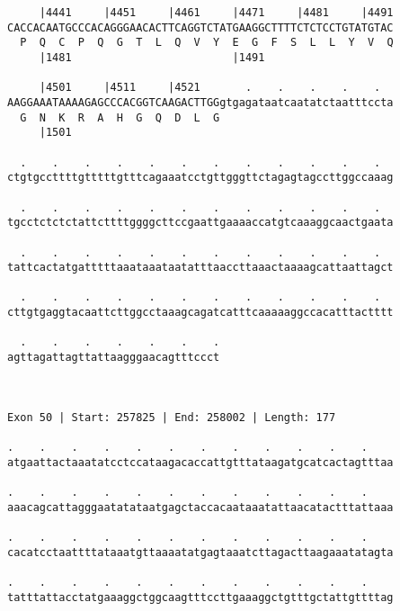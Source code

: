 \documentclass{article}
\begin{document}
\begin{Verbatim}
     |4441     |4451     |4461     |4471     |4481     |4491
CACCACAATGCCCACAGGGAACACTTCAGGTCTATGAAGGCTTTTCTCTCCTGTATGTAC
  P  Q  C  P  Q  G  T  L  Q  V  Y  E  G  F  S  L  L  Y  V  Q
     |1481                         |1491                    
  
     |4501     |4511     |4521       .    .    .    .    .  
AAGGAAATAAAAGAGCCCACGGTCAAGACTTGGgtgagataatcaatatctaatttccta
  G  N  K  R  A  H  G  Q  D  L  G                           
     |1501                                                  
  
  .    .    .    .    .    .    .    .    .    .    .    .  
ctgtgccttttgtttttgtttcagaaatcctgttgggttctagagtagccttggccaaag
                                                            
  .    .    .    .    .    .    .    .    .    .    .    .  
tgcctctctctattcttttggggcttccgaattgaaaaccatgtcaaaggcaactgaata
                                                            
  .    .    .    .    .    .    .    .    .    .    .    .  
tattcactatgatttttaaataaataatatttaaccttaaactaaaagcattaattagct
                                                            
  .    .    .    .    .    .    .    .    .    .    .    .  
cttgtgaggtacaattcttggcctaaagcagatcatttcaaaaaggccacatttactttt
                                                            
  .    .    .    .    .    .    .
agttagattagttattaagggaacagtttccct
                                 
                                 
 
Exon 50 | Start: 257825 | End: 258002 | Length: 177
 
.    .    .    .    .    .    .    .    .    .    .    .    
atgaattactaaatatcctccataagacaccattgtttataagatgcatcactagtttaa
                                                            
.    .    .    .    .    .    .    .    .    .    .    .    
aaacagcattagggaatatataatgagctaccacaataaatattaacatactttattaaa
                                                            
.    .    .    .    .    .    .    .    .    .    .    .    
cacatcctaattttataaatgttaaaatatgagtaaatcttagacttaagaaatatagta
                                                            
.    .    .    .    .    .    .    .    .    .    .    .    
tatttattacctatgaaaggctggcaagtttccttgaaaggctgtttgctattgttttag
                                                            

\end{Verbatim}
\end{document}
